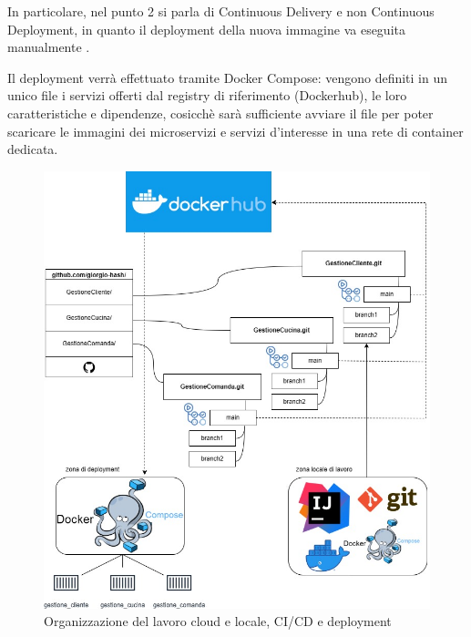 In particolare, nel punto 2 si parla di Continuous Delivery e non Continuous Deployment, in quanto il deployment della nuova immagine va eseguita manualmente \cite{CDDocker}.

Il deployment verrà effettuato tramite Docker Compose: vengono definiti in un unico file i servizi offerti dal registry di riferimento (Dockerhub), le loro caratteristiche e dipendenze, cosicchè sarà sufficiente avviare il file per poter scaricare le immagini dei microservizi e servizi d’interesse in una rete di container dedicata.



\begin{figure}[htbp]
	\centering
	\includegraphics[scale=0.36]{iterazione1/images/DevOps.jpg}
	\caption{Organizzazione del lavoro cloud e locale, CI/CD e deployment 
 \label{fig:devopsit1}}
\end{figure}


